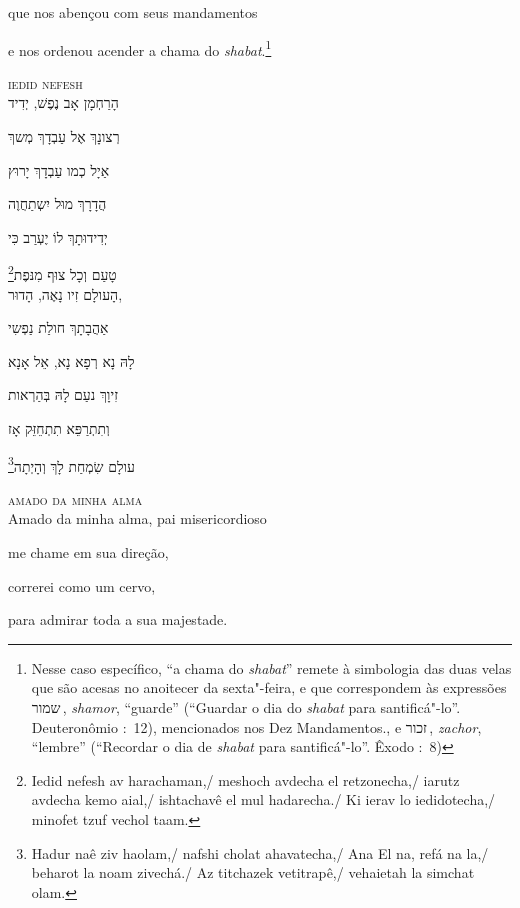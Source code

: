 que nos abençou com seus mandamentos\label{ref01}

e nos ordenou acender a chama do \textit{shabat}.\footnote{Nesse caso 
	específico, ``a chama do \textit{shabat}'' remete à simbologia das duas velas
	que são acesas no anoitecer da sexta"-feira, e que correspondem às
	expressões שמור\,, \emph{shamor}, ``guarde'' (``Guardar o dia do
	\emph{shabat} para santificá"-lo''. Deuteronômio :~12),
	mencionados nos Dez Mandamentos., e זכור\,, \emph{zachor}, ``lembre''
	(``Recordar o dia de \emph{shabat} para santificá"-lo''. Êxodo
	:~8)}

\movetoevenpage
\raggedleft


\textsc{iedid nefesh}\\[15pt]

הָרַחְמָן אָב נֶפֶשׁ, יְדִיד 

רְצונָךְ אֶל עַבְדָךְ מְשךְ 

אַיָל כְמו עַבְדָךְ יָרוּץ 

הֲדָרָךְ מוּל יִשְתַחֲוֶה 

יְדִידוּתָךְ לוֹ יֶעְרַב כִּי 

\footnote{Iedid nefesh av harachaman,/ meshoch avdecha el retzonecha,/ iarutz avdecha kemo aial,/ ishtachavê el mul hadarecha./ Ki ierav lo iedidotecha,/ minofet tzuf vechol taam.}טָעַם וְכָל צוּף מִנּפֶת\\[10pt]

הָעולָם זִיו נָאֶה, הָדוּר,

אַהֲבָתָךְ חולַת נַפְשִי 

לָהּ נָא רְפָא נָא, אֵל אָנָא 

זִיוָךְ נעַם לָהּ בְּהַרְאות

וְתִתְרַפֵּא תִתְחֵזֵּק אָז

\footnote{Hadur naê ziv haolam,/ nafshi cholat ahavatecha,/ Ana El na, refá na la,/ beharot la noam zivechá./ Az titchazek vetitrapê,/ vehaietah la simchat olam.}עולָם שִׂמְחַת לָךְ וְהָיְתָה\\[10pt]


\movetooddpage
\raggedright

\textsc{amado da minha alma}\\[15pt]

{Amado da minha alma}, pai misericordioso

me chame em sua direção,

correrei como um cervo,

para admirar toda a sua majestade.

